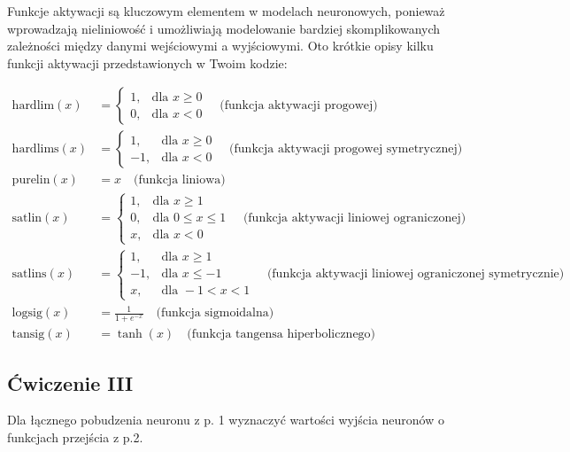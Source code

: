 \documentclass[12pt,twoside]{article}
\begin{document}
Funkcje aktywacji są kluczowym elementem w modelach neuronowych, ponieważ wprowadzają nieliniowość i umożliwiają modelowanie bardziej skomplikowanych zależności między danymi wejściowymi a wyjściowymi. Oto krótkie opisy kilku funkcji aktywacji przedstawionych w Twoim kodzie:

\begin{align*}
	\text{hardlim}(x) &= \begin{cases}
	1, & \text{dla } x \geq 0 \\
	0, & \text{dla } x < 0
	\end{cases} \quad \text{(funkcja aktywacji progowej)} \\
	\text{hardlims}(x) &= \begin{cases}
	1, & \text{dla } x \geq 0 \\
	-1, & \text{dla } x < 0
	\end{cases} \quad \text{(funkcja aktywacji progowej symetrycznej)} \\
	\text{purelin}(x) &= x \quad \text{(funkcja liniowa)} \\
	\text{satlin}(x) &= \begin{cases}
	1, & \text{dla } x \geq 1 \\
	0, & \text{dla } 0 \leq x \leq 1 \\
	x, & \text{dla } x < 0
	\end{cases} \quad \text{(funkcja aktywacji liniowej ograniczonej)} \\
	\text{satlins}(x) &= \begin{cases}
	1, & \text{dla } x \geq 1 \\
	-1, & \text{dla } x \leq -1 \\
	x, & \text{dla } -1 < x < 1
	\end{cases} \quad \text{(funkcja aktywacji liniowej ograniczonej symetrycznie)} \\
	\text{logsig}(x) &= \frac{1}{1 + e^{-x}} \quad \text{(funkcja sigmoidalna)} \\
	\text{tansig}(x) &= \tanh(x) \quad \text{(funkcja tangensa hiperbolicznego)}
	\end{align*}


	\subsection{Ćwiczenie III}
	Dla łącznego pobudzenia neuronu z p. 1 wyznaczyć wartości wyjścia neuronów o funkcjach przejścia z p.2.
\end{document}

